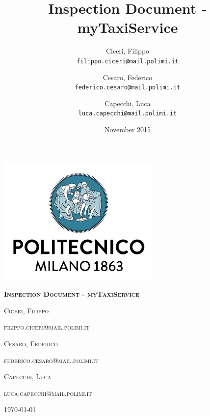\documentclass[12pt,a4paper,titlepage]{article}
\title{Inspection Document - myTaxiService}
\author{
	Ciceri, Filippo \\
	\texttt{filippo.ciceri@mail.polimi.it}
	\and
	Cesaro, Federico \\
	\texttt{federico.cesaro@mail.polimi.it}
	\and
	Capecchi, Luca \\
	\texttt{luca.capecchi@mail.polimi.it}
}
\date{November 2015}
\begin{document}
\begin{titlepage}
	\centering
	\includegraphics[width=8cm]{polimiLogo}\par\vspace{2cm}
	{\scshape\huge\bfseries Inspection Document - myTaxiService \par}
	\vspace{1.5cm}
	{\scshape\large Ciceri, Filippo \par}
	{\scshape\normalsize filippo.ciceri@mail.polimi.it \par}
	\vspace{0.5cm}
	{\scshape\large Cesaro, Federico \par}
	{\scshape\normalsize federico.cesaro@mail.polimi.it \par}
	\vspace{0.5cm}
	{\scshape\large Capecchi, Luca \par}
	{\scshape\normalsize luca.capecchi@mail.polimi.it \par}
	\vspace{0.5cm}

	\vfill

	{\large \today\par}
\end{titlepage}
\tableofcontents
\newpage

\newpage


\newpage


\newpage


\newpage


\newpage

\end{document}
